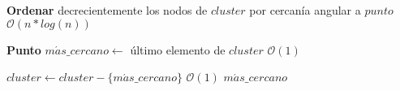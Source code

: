 \begin{algorithm}[H]
\caption{\Comment $\mathcal{O}(n)$}
\begin{algorithmic}[1]
	\State \textbf{Ordenar} decrecientemente los nodos de $cluster$ por cercanía angular a $punto$
	\Comment $\mathcal{O}(n*log(n))$

	\State \textbf{Punto} $m\acute{a}s\_cercano \gets$ último elemento de $cluster$
	\Comment $\mathcal{O}(1)$

	\State $cluster \gets cluster - \{m\acute{a}s\_cercano\}$
	\Comment $\mathcal{O}(1)$
	\Statex
	\State \Return $m\acute{a}s\_cercano$
\EndFunction
\end{algorithmic}
\end{algorithm}